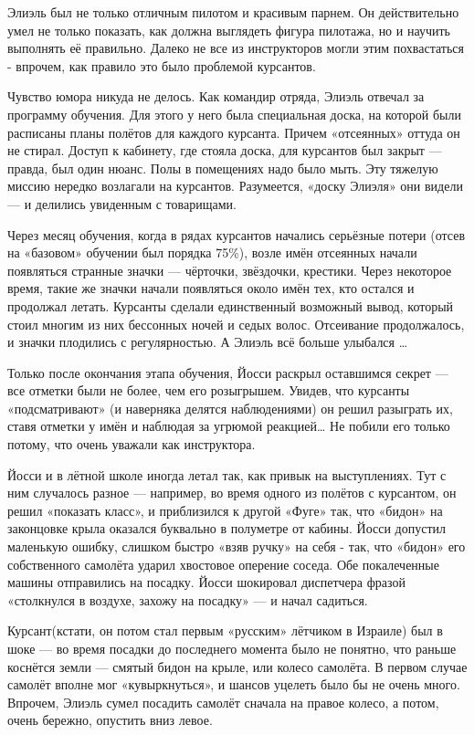 Элиэль был не только отличным пилотом и красивым парнем. Он действительно умел не только показать, как должна выглядеть фигура пилотажа, но и научить выполнять её правильно. Далеко не все из инструкторов могли этим похвастаться - впрочем, как правило это было проблемой курсантов.

Чувство юмора никуда не делось. Как командир отряда, Элиэль отвечал за программу обучения. Для этого у него была специальная доска, на которой были расписаны планы полётов для каждого курсанта. Причем «отсеянных» оттуда он не стирал. Доступ к кабинету, где стояла доска, для курсантов был закрыт — правда, был один нюанс. Полы в помещениях надо было мыть. Эту тяжелую миссию нередко возлагали на курсантов. Разумеется, «доску Элиэля» они видели — и делились увиденным с товарищами.

Через месяц обучения, когда в рядах курсантов начались серьёзные потери (отсев на «базовом» обучении был порядка 75\%), возле имён отсеянных начали появляться странные значки — чёрточки, звёздочки, крестики. Через некоторое время, такие же значки начали появляться около имён тех, кто остался и продолжал летать. Курсанты сделали единственный возможный вывод, который стоил многим из них бессонных ночей и седых волос. Отсеивание продолжалось, и значки плодились с регулярностью. А Элиэль всё больше улыбался …

Только после окончания этапа обучения, Йосси раскрыл оставшимся секрет — все отметки были не более, чем его розыгрышем. Увидев, что курсанты «подсматривают» (и наверняка делятся наблюдениями) он решил разыграть их, ставя отметки у имён и наблюдая за угрюмой реакцией… Не побили его только потому, что очень уважали как инструктора.

Йосси и в лётной школе иногда летал так, как привык на выступлениях. Тут с ним случалось разное — например, во время одного из полётов с курсантом, он решил «показать класс», и приблизился к другой «Фуге» так, что «бидон» на законцовке крыла оказался буквально в полуметре от кабины. Йосси допустил маленькую ошибку, слишком быстро «взяв ручку» на себя - так, что «бидон» его собственного самолёта ударил хвостовое оперение соседа. Обе покалеченные машины отправились на посадку. Йосси шокировал диспетчера фразой «столкнулся в воздухе, захожу на посадку» — и начал садиться.

Курсант(кстати, он потом стал первым «русским» лётчиком в Израиле) был в шоке — во время посадки до последнего момента было не понятно, что раньше коснётся земли — смятый бидон на крыле, или колесо самолёта. В первом случае самолёт вполне мог «кувыркнуться», и шансов уцелеть было бы не очень много. Впрочем, Элиэль сумел посадить самолёт сначала на правое колесо, а потом, очень бережно, опустить вниз левое. 

